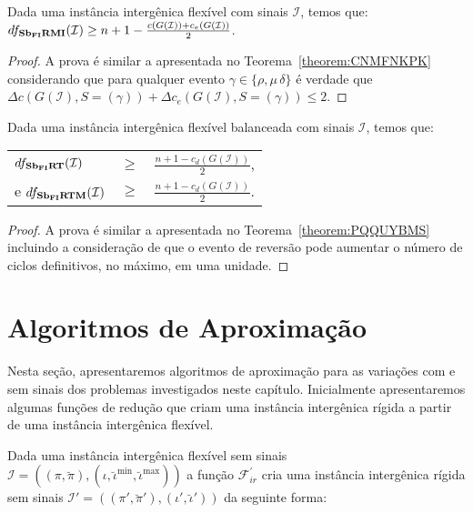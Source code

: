 \begin{theorem}\label{theorem:XQPRYMFX}
Dada uma instância intergênica flexível com sinais $\mathcal{I}$, temos que:\break $df_{\textbf{Sb\textsubscript{FI}RMI}}(\mathcal{I}) \ge {n+1} - \frac{c(G(\mathcal{I} )) + c_e(G(\mathcal{I} ))}{2}$.
\end{theorem}
\begin{proof}
A prova é similar a apresentada no Teorema~\ref{theorem:CNMFNKPK} considerando que para qualquer evento $\gamma \in \{\rho, \mu\,\delta\}$ é verdade que $\Delta c(G(\mathcal{I}), S=(\gamma)) + \Delta c_e(G(\mathcal{I}), S=(\gamma)) \le 2$.
\end{proof}

\begin{theorem}\label{theorem:HELIIGVZ}
Dada uma instância intergênica flexível balanceada com sinais $\mathcal{I}$, temos que:

\begin{tabular}{lll}
  $df_{\textbf{Sb\textsubscript{FI}RT}}(\mathcal{I})$     & $ \ge $ & $\frac{{n+1} - c_d(G(\mathcal{I} ))}{2}$, \\
  e $df_{\textbf{Sb\textsubscript{FI}RTM}}(\mathcal{I})$  & $ \ge $ & $\frac{{n+1} - c_d(G(\mathcal{I} ))}{2}$. \\
\end{tabular}
\end{theorem}
\begin{proof}
A prova é similar a apresentada no Teorema~\ref{theorem:PQQUYBMS} incluindo a consideração de que o evento de reversão pode aumentar o número de ciclos definitivos, no máximo, em uma unidade.
\end{proof}

\section{Algoritmos de Aproximação}

Nesta seção, apresentaremos algoritmos de aproximação para as variações com e sem sinais dos problemas investigados neste capítulo. Inicialmente apresentaremos algumas funções de redução que criam uma instância intergênica rígida a partir de uma instância intergênica flexível.

Dada uma instância intergênica flexível sem sinais $\mathcal{I} = ((\pi,\breve\pi),(\iota,\breve\iota^{\min},\breve\iota^{\max}))$ a função $\mathcal{F}_{ir}^{'}$ cria uma instância intergênica rígida sem sinais $\mathcal{I'} = ((\pi',\breve\pi'),(\iota',\breve\iota'))$ da seguinte forma:


